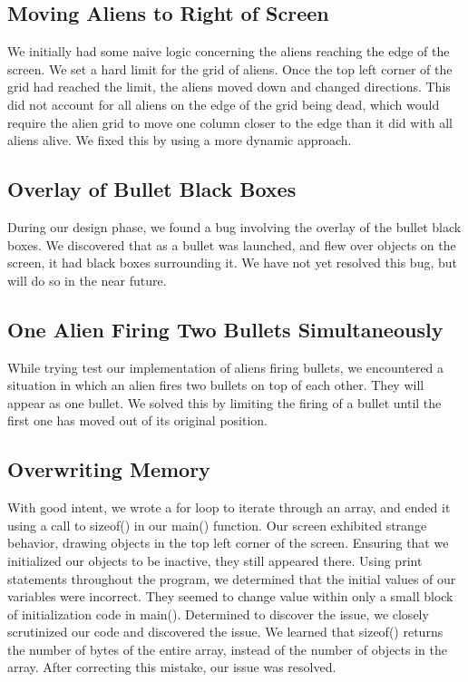 \documentclass[11pt,letter,oneside]{report}
\begin{document}
\subsection{Moving Aliens to Right of Screen}
We initially had some naive logic concerning the aliens reaching the edge of the screen.  We set a hard limit for the grid of aliens.  Once the top left corner of the grid had reached the limit, the aliens moved down and changed directions.  This did not account for all aliens on the edge of the grid being dead, which would require the alien grid to move one column closer to the edge than it did with all aliens alive.  We fixed this by using a more dynamic approach.

\subsection{Overlay of Bullet Black Boxes}
During our design phase, we found a bug involving the overlay of the bullet black boxes. We discovered that as a bullet was launched, and flew over objects on the screen, it had black boxes surrounding it. We have not yet resolved this bug, but will do so in the near future.

\subsection{One Alien Firing Two Bullets Simultaneously}
While trying test our implementation of aliens firing bullets, we encountered a situation in which an alien fires two bullets on top of each other.  They will appear as one bullet.  We solved this by limiting the firing of a bullet until the first one has moved out of its original position. 

\subsection{Overwriting Memory}
With good intent, we wrote a for loop to iterate through an array, and ended it using a call to sizeof() in our main() function. Our screen exhibited strange behavior, drawing objects in the top left corner of the screen. Ensuring that we initialized our objects to be inactive, they still appeared there. Using print statements throughout the program, we determined that the initial values of our variables were incorrect. They seemed to change value within only a small block of initialization code in main(). Determined to discover the issue, we closely scrutinized our code and discovered the issue. We learned that sizeof() returns the number of bytes of the entire array, instead of the number of objects in the array. After correcting this mistake, our issue was resolved.
\end{document}
